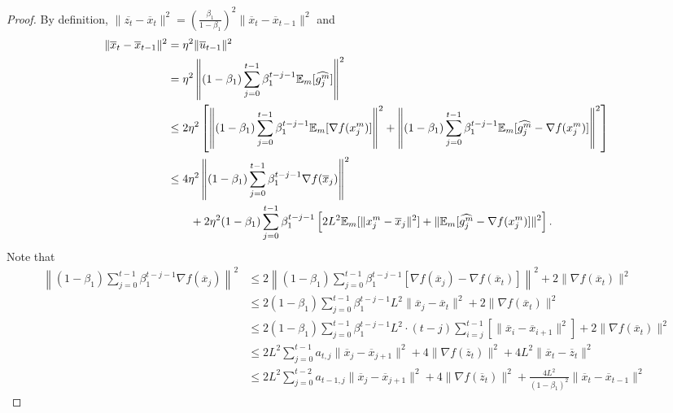 \documentclass{article} %
\numberwithin{equation}{section}
\begin{document}
\begin{proof}
    By definition, $\|\overline{z_t}-\overline{x}_t\|^2=\left(\frac{\beta_1}{1-\beta_1}\right)^2\|\overline{x}_t-\overline{x}_{t-1}\|^2$ and
    \begin{equation}
        \begin{aligned}
            \|\overline{x}_t-\overline{x}_{t-1}\|^2
            &=\eta^2\|\overline{u}_{t-1}\|^2 \\
            &=\eta^2\left\|(1-\beta_1)\sum_{j=0}^{t-1}\beta_1^{t-j-1}\mathbb{E}_m[\widehat{g_j^m}]\right\|^2 \\
            &\leq 2\eta^2\left[\left\|(1-\beta_1)\sum_{j=0}^{t-1}\beta_1^{t-j-1}\mathbb{E}_m[\nabla f(x_j^m)]\right\|^2 + \left\|(1-\beta_1)\sum_{j=0}^{t-1}\beta_1^{t-j-1}\mathbb{E}_m[\widehat{g_j^m}-\nabla f(x_j^m)]\right\|^2 \right] \\
            &\leq 4\eta^2\left\|(1-\beta_1)\sum_{j=0}^{t-1}\beta_1^{t-j-1}\nabla f(\overline{x}_j)\right\|^2 \\ 
            &\qquad + 2\eta^2(1-\beta_1)\sum_{j=0}^{t-1}\beta_1^{t-j-1}\left[2L^2\mathbb{E}_m[\|x_j^m-\overline{x}_j\|^2]+\|\mathbb{E}_m[\widehat{g_j^m}-\nabla f(x_j^m)]\|^2 \right].
        \end{aligned}
    \end{equation}
    Note that
    \begin{equation}
        \begin{aligned}
            \left\|(1-\beta_1)\sum_{j=0}^{t-1}\beta_1^{t-j-1}\nabla f(\overline{x}_j)\right\|^2
            &\leq 2\left\|(1-\beta_1)\sum_{j=0}^{t-1}\beta_1^{t-j-1}[\nabla f(\overline{x}_j)-\nabla f(\overline{x}_t)]\right\|^2 + 2\|\nabla f(\overline{x}_t)\|^2 \\
            &\leq 2(1-\beta_1)\sum_{j=0}^{t-1}\beta_1^{t-j-1}L^2\|\overline{x}_j-\overline{x}_t\|^2 + 2\|\nabla f(\overline{x}_t)\|^2 \\
            &\leq 2(1-\beta_1)\sum_{j=0}^{t-1}\beta_1^{t-j-1}L^2\cdot (t-j)\sum_{i=j}^{t-1}[\|\overline{x}_i-\overline{x}_{i+1}\|^2] + 2\|\nabla f(\overline{x}_t)\|^2 \\
            &\leq 2L^2\sum_{j=0}^{t-1}a_{t,j}\|\overline{x}_j-\overline{x}_{j+1}\|^2 + 4\|\nabla f(\overline{z}_t)\|^2 + 4L^2\|\overline{x}_t-\overline{z}_t\|^2 \\
            &\leq 2L^2\sum_{j=0}^{t-2}a_{t-1,j}\|\overline{x}_j-\overline{x}_{j+1}\|^2 + 4\|\nabla f(\overline{z}_t)\|^2 + \frac{4L^2}{(1-\beta_1)^2}\|\overline{x}_t-\overline{x}_{t-1}\|^2
        \end{aligned}

\end{equation}
\end{proof}
\end{document}
